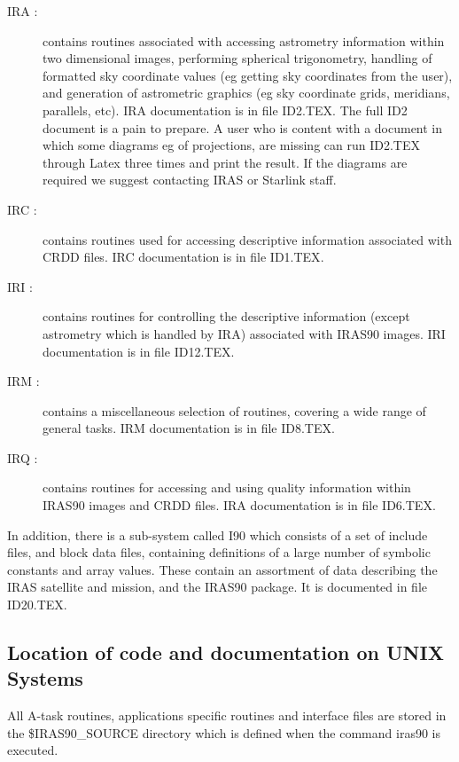 \begin{description}

\item [IRA :] contains routines associated with accessing astrometry
information within two dimensional images, performing spherical
trigonometry, handling of formatted sky coordinate values (eg getting
sky coordinates from the user), and generation of astrometric graphics
(eg sky coordinate grids, meridians, parallels, etc). {\small IRA}
documentation is in file {\small ID2.TEX}. The full {\small ID2}
document is a pain to prepare. A user who is content with a document in 
which some diagrams eg of projections, are missing can run {\small ID2.TEX}
through Latex three times and print the result. If the diagrams are required
we suggest contacting IRAS or Starlink staff.

\item [IRC :] contains routines used for accessing descriptive
information associated with {\small CRDD} files. {\small IRC}
documentation is in file {\small ID1.TEX}.

\item [IRI :] contains routines for controlling the descriptive
information (except astrometry which is handled by {\small IRA})
associated with {\small IRAS90} images. {\small IRI} documentation is
in file {\small ID12.TEX}.

\item [IRM :] contains a miscellaneous selection of routines, covering
a wide range of general tasks. {\small IRM} documentation is in file
{\small ID8.TEX}.

\item [IRQ :] contains routines for accessing and using quality
information within {\small IRAS90} images and {\small CRDD} files.
{\small IRA} documentation is in file {\small ID6.TEX}.

\end{description}

In addition, there is a sub-system called I90 which consists of a set
of include files, and block data files, containing definitions of a
large number of symbolic constants and array values. These contain an
assortment of data describing the {\small IRAS} satellite and mission,
and the {\small IRAS90} package. It is documented in file {\small
ID20.TEX}.

\subsection{Location of code and documentation on UNIX Systems}
\label{SEC:UNIXS} 
All A-task routines, applications specific routines and interface files are
stored in the 
\newline
\$IRAS90\_SOURCE directory which is defined when the command iras90 is executed.

